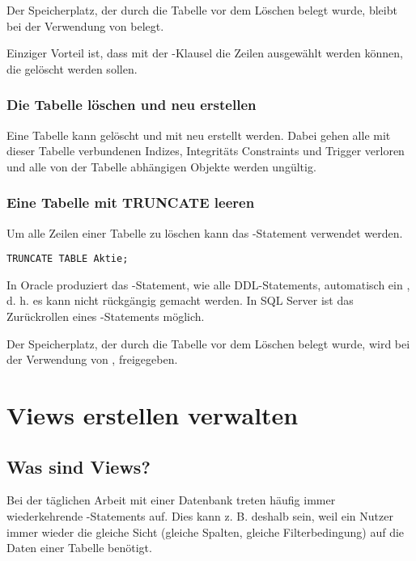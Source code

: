           \begin{merke}
            Der Speicherplatz, der durch die Tabelle vor dem Löschen belegt
            wurde, bleibt bei der Verwendung von  belegt.
          \end{merke}
          Einziger Vorteil ist, dass mit der -Klausel die
          Zeilen ausgewählt werden können, die gelöscht werden sollen.
        \subsubsection{Die Tabelle löschen und neu erstellen}
          \label{dropandrecreatetable}
          Eine Tabelle kann gelöscht und mit  neu
          erstellt werden. Dabei gehen alle mit dieser Tabelle verbundenen
          Indizes, Integritäts Constraints und Trigger verloren und alle von
          der Tabelle abhängigen Objekte werden ungültig.
        \subsubsection{Eine Tabelle mit TRUNCATE leeren}
          Um alle Zeilen einer Tabelle zu löschen kann das -Statement verwendet werden.
          \begin{lstlisting}[language=oracle_sql, caption={Zeilen mit TRUNCATE
          abschneiden},label=sql08_23]
TRUNCATE TABLE Aktie;
          \end{lstlisting}
          \begin{merke}
            In Oracle produziert das -Statement, wie
            alle DDL-Statements, automatisch ein , d. h.
            es kann nicht rückgängig gemacht werden. In SQL Server ist das
            Zurückrollen eines -Statements möglich.
          \end{merke}

          \begin{merke}
            Der Speicherplatz, der durch die Tabelle vor dem Löschen belegt
            wurde, wird bei der Verwendung von ,
            freigegeben.
          \end{merke}
    \section{Views erstellen verwalten}
      \subsection{Was sind Views?}
        Bei der täglichen Arbeit mit einer Datenbank treten häufig immer wiederkehrende \SELECT-Statements auf. Dies kann z. B. deshalb sein, weil ein Nutzer immer wieder die gleiche Sicht (gleiche Spalten, gleiche Filterbedingung) auf die Daten einer Tabelle benötigt.

